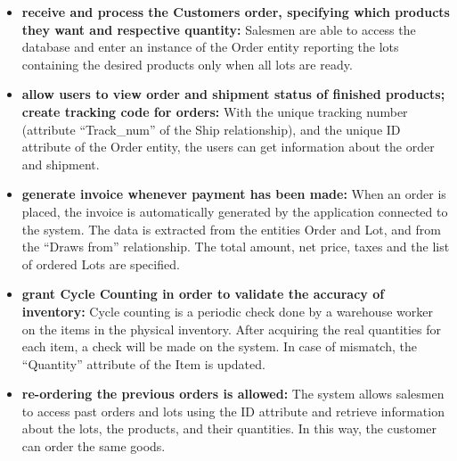 \begin{itemize}
    \item \textbf{receive and process the Customers order, specifying which products they want and respective quantity:} Salesmen are able to access the database and enter an instance of the Order entity reporting the lots containing the desired products only when all lots are ready.
    \item \textbf{allow users to view order and shipment status of finished products; create tracking code for orders:} With the unique tracking number (attribute ``Track\_num'' of the Ship relationship), and the unique ID attribute of the Order entity, the users can get information about the order and shipment.
    \item \textbf{generate invoice whenever payment has been made:} When an order is placed, the invoice is automatically generated by the application connected to the system. The data is extracted from the entities Order and Lot, and from the ``Draws from'' relationship. The total amount, net price, taxes and the list of ordered Lots are specified.
    \item \textbf{grant Cycle Counting in order to validate the accuracy of inventory:} Cycle counting is a periodic check done by a warehouse worker on the items in the physical inventory. After acquiring the real quantities for each item, a check will be made on the system. In case of mismatch, the ``Quantity'' attribute of the Item is updated. 
    \item \textbf{re-ordering the previous orders is allowed:} The system allows salesmen to access past orders and lots using the ID attribute and retrieve information about the lots, the products, and their quantities. In this way, the customer can order the same goods. 
\end{itemize}



